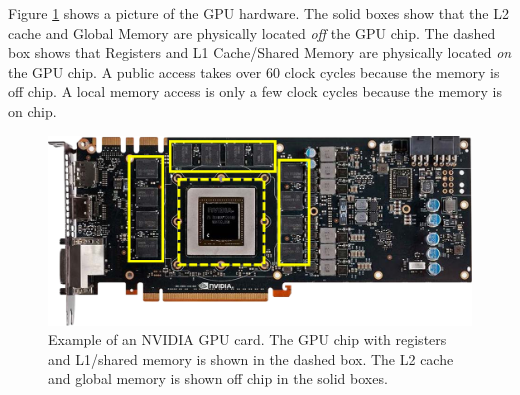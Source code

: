 Figure \ref{fig:GPUarch} shows a picture of the GPU hardware.
The solid boxes show that the L2 cache and Global Memory are physically located \textit{off} the GPU chip. 
The dashed box shows that Registers and L1 Cache/Shared Memory are physically located \textit{on} the GPU chip. 
A public access takes over 60 clock cycles because the memory is off chip. 
A local memory access is only a few clock cycles because the memory is on chip.
\begin{figure}
	\centering\includegraphics[width=\textwidth]{figures/gpu_intro/Kepler_box.png}
	\caption{Example of an NVIDIA GPU card. The GPU chip with registers and L1/shared memory is shown in the dashed box.	The L2 cache and global memory is shown off chip in the solid boxes.}
	\label{fig:GPUarch}
\end{figure}


